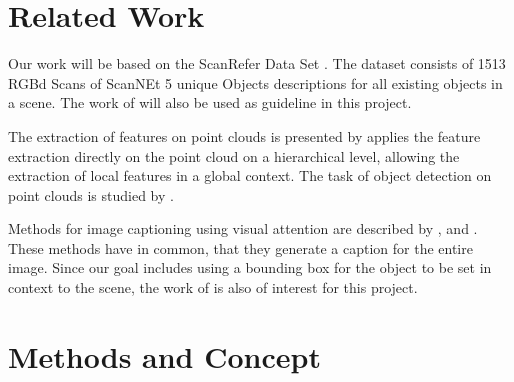 \documentclass[10pt,twocolumn,letterpaper]{article}
\begin{document}
\section{Related Work}
Our work will be based on the ScanRefer Data Set \cite{Chen2019}. The dataset consists of 1513 RGBd Scans of ScanNEt\cite{Dai2017} 5 unique Objects descriptions for all existing objects in a scene. The work of \cite{Chen2019} will also be used as guideline in this project.

The extraction of features on point clouds is presented by \cite{Qi2017} applies the feature extraction directly on the point cloud on a hierarchical level, allowing the extraction of local features in a global context. 
The task of object detection on point clouds is studied by \cite{Qi2019}. 

Methods for image captioning using visual attention are described by \cite{Xu2015}, \cite{Lu2016} and \cite{Anderson2017}.
These methods have in common, that they generate a caption for the entire image.
Since our goal includes using a bounding box for the object to be set in context to the scene, the work of \cite{Rohrbach2015}is also of interest for this project. 

\section{Methods and Concept}


{\small


}
\end{document}
